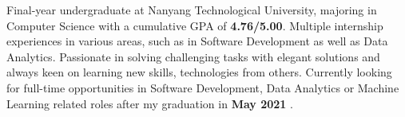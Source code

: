 

\begin{cvparagraph}

Final-year undergraduate at Nanyang Technological University, majoring in Computer Science with a cumulative GPA of \textbf{4.76/5.00}. Multiple internship experiences in various areas, such as in Software Development as well as Data Analytics. Passionate in solving challenging tasks with elegant solutions and always keen on learning new skills, technologies from others. Currently looking for full-time opportunities in Software Development, Data Analytics or Machine Learning related roles after my graduation in \textbf{May 2021} .
\end{cvparagraph}
